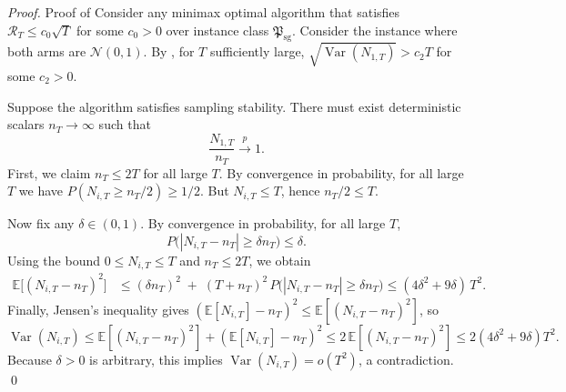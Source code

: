 \documentclass[nonblindrev]{informs3_noinforms}
\newcommand{\var}{\operatorname{Var}}
\begin{document}
\begin{proof}{Proof of }
    Consider any minimax optimal algorithm that satisfies $\mathcal R_T\leq c_0\sqrt T$ for some $c_0>0$ over instance class $\mathfrak{P}_{\mathrm{sg}}$. Consider the instance where both arms are $\mathcal N(0,1)$. By , for $T$ sufficiently large, $\sqrt{\var (N_{1,T})}>c_2T$ for some $c_2>0$. 

Suppose the algorithm satisfies sampling stability. There must exist deterministic scalars $n_T\to\infty$ such that
\[
\frac{N_{1,T}}{n_T}\xrightarrow{p}1.
\]
First, we claim $n_T\le 2T$ for all large $T$. By convergence in probability, for all large $T$ we have
$P(N_{i,T}\ge n_T/2)\ge 1/2$. But $N_{i,T}\le T$, hence $n_T/2\le T$.

Now fix any $\delta\in(0,1)$. By convergence in probability, for all large $T$,
\[
P\big(|N_{i,T}-n_T|\ge \delta n_T\big)\le \delta.
\]
Using the bound $0\le N_{i,T}\le T$ and $n_T\le 2T$, we obtain
\begin{align*}
\mathbb E\big[(N_{i,T}-n_T)^2\big]
&\le (\delta n_T)^2 \;+\; (T+n_T)^2\,P\big(|N_{i,T}-n_T|\ge \delta n_T\big)\le(4\delta^2+9\delta)\,T^2.
\end{align*}
Finally, Jensen's inequality gives $(\mathbb E[N_{i,T}]-n_T)^2\le \mathbb E[(N_{i,T}-n_T)^2]$,
so
\[
\var(N_{i,T})
\le \mathbb E[(N_{i,T}-n_T)^2] + (\mathbb E[N_{i,T}]-n_T)^2
\le 2\,\mathbb E[(N_{i,T}-n_T)^2]
\le 2(4\delta^2+9\delta)T^2.
\]
Because $\delta>0$ is arbitrary, this implies $\var(N_{i,T})=o(T^2)$, a contradiction. \qed
\end{proof}
\end{document}
